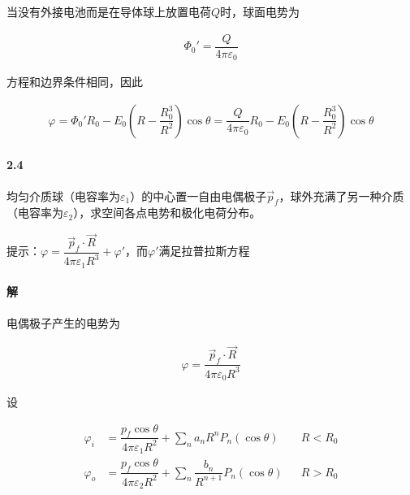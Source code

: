 \documentclass{article}
\begin{document}
当没有外接电池而是在导体球上放置电荷$Q$时，球面电势为

\begin{equation*}
  \begin{aligned}
    \Phi_0' = \dfrac{Q}{4 \pi \varepsilon_0} 
  \end{aligned}
\end{equation*}

方程和边界条件相同，因此

\begin{equation*}
  \begin{aligned}
    \varphi = \Phi_0' R_0 - E_0 \left( R - \dfrac{R_0^3}{R^2}  \right) \cos \theta
    = \dfrac{Q}{4 \pi \varepsilon_0} R_0 - E_0 \left( R - \dfrac{R_0^3}{R^2}  \right) \cos \theta
  \end{aligned}
\end{equation*}

\paragraph{2.4}

均匀介质球（电容率为$\varepsilon_1$）的中心置一自由电偶极子$\vec{p}_f$，球外充满了另一种介质（电容率为$\varepsilon_2$），求空间各点电势和极化电荷分布。

提示：$\varphi = \dfrac{\vec{p}_f \cdot \vec{R}}{ 4 \pi \varepsilon_1 R^3} + \varphi' $，而$\varphi'$满足拉普拉斯方程

\paragraph{解}

电偶极子产生的电势为

\begin{equation*}
  \begin{aligned}
    \varphi = \dfrac{\vec{p}_f \cdot \vec{R}}{4 \pi \varepsilon_0 R^3} 
  \end{aligned}
\end{equation*}

设

\begin{equation*}
  \begin{aligned}
    \varphi_i &= \dfrac{p_f\cos \theta}{4\pi \varepsilon_1 R^2} + \sum_n a_n R^n P_n \left( \cos \theta \right) && R < R_0 \\
    \varphi_o &= \dfrac{p_f\cos \theta}{4\pi \varepsilon_2 R^2} + \sum_n \dfrac{b_n}{R^{n+1}}  P_n \left( \cos \theta \right) && R > R_0 
  \end{aligned}
\end{equation*}
\end{document}
